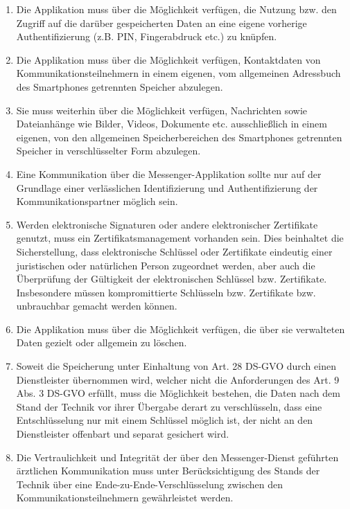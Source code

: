     \begin{enumerate}[label={(\arabic*)}]
        \item Die Applikation muss über die Möglichkeit verfügen, die Nutzung bzw. den Zugriff
    auf die darüber gespeicherten Daten an eine eigene vorherige Authentifizierung (z.B.
    PIN, Fingerabdruck etc.) zu knüpfen.
        \item Die Applikation muss über die Möglichkeit verfügen, Kontaktdaten von
    Kommunikationsteilnehmern in einem eigenen, vom allgemeinen Adressbuch des
    Smartphones getrennten Speicher abzulegen.
        \item Sie muss weiterhin über die Möglichkeit verfügen,
    Nachrichten sowie Dateianhänge wie Bilder, Videos, Dokumente etc. ausschließlich
    in einem eigenen, von den allgemeinen Speicherbereichen des Smartphones
    getrennten Speicher in verschlüsselter Form abzulegen.
        \item Eine Kommunikation über die Messenger-Applikation sollte nur auf
    der Grundlage einer verlässlichen Identifizierung und Authentifizierung der
    Kommunikationspartner möglich sein.
        \item Werden elektronische Signaturen oder andere elektronischer Zertifikate genutzt,
    muss ein Zertifikatsmanagement vorhanden sein. Dies beinhaltet die Sicherstellung,
    dass elektronische Schlüssel oder Zertifikate eindeutig einer juristischen oder
    natürlichen Person zugeordnet werden, aber auch die Überprüfung der Gültigkeit der
    elektronischen Schlüssel bzw. Zertifikate. Insbesondere müssen kompromittierte
    Schlüsseln bzw. Zertifikate bzw. unbrauchbar gemacht werden können.
        \item Die Applikation muss über die Möglichkeit verfügen, die über sie verwalteten Daten
    gezielt oder allgemein zu löschen.
        \item Soweit die Speicherung unter Einhaltung von Art. 28 DS-GVO durch einen Dienstleister übernommen wird, welcher nicht die Anforderungen des Art. 9 Abs. 3 DS-GVO erfüllt,
    muss die Möglichkeit bestehen, die Daten nach dem Stand der Technik vor ihrer
    Übergabe derart zu verschlüsseln, dass eine Entschlüsselung nur mit einem
    Schlüssel möglich ist, der nicht an den Dienstleister offenbart und separat gesichert
    wird.
        \item Die Vertraulichkeit und Integrität der über den Messenger-Dienst geführten
    ärztlichen Kommunikation muss unter Berücksichtigung des Stands der Technik
    über eine Ende-zu-Ende-Verschlüsselung zwischen den
    Kommunikationsteilnehmern gewährleistet werden.
    \end{enumerate}


